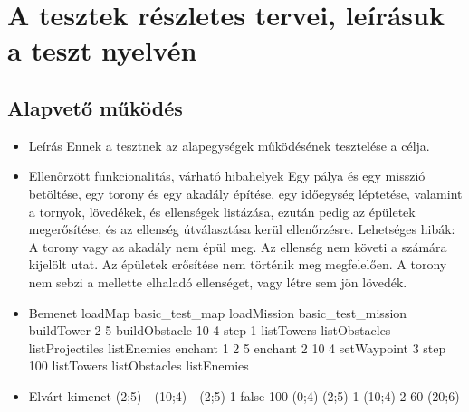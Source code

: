 \section{A tesztek részletes tervei, leírásuk a teszt nyelvén}

\subsection{Alapvető működés}
\begin{itemize}
\item Leírás\newline
Ennek a tesztnek az alapegységek működésének tesztelése a célja.
\item Ellenőrzött funkcionalitás, várható hibahelyek\newline
Egy pálya és egy misszió betöltése, egy torony és egy akadály építése, egy időegység léptetése, valamint a tornyok, lövedékek, és ellenségek listázása, ezután pedig az épületek megerősítése, és az ellenség útválasztása kerül ellenőrzésre. Lehetséges hibák: A torony vagy az akadály nem épül meg. Az ellenség nem követi a számára kijelölt utat. Az épületek erősítése nem történik meg megfelelően. A torony nem sebzi a mellette elhaladó ellenséget, vagy létre sem jön lövedék.
\item Bemenet\newline
loadMap basic\_test\_map\newline
loadMission basic\_test\_mission\newline
buildTower 2 5\newline
buildObstacle 10 4\newline
step 1\newline
listTowers\newline
listObstacles\newline
listProjectiles\newline
listEnemies\newline
enchant 1 2 5\newline
enchant 2 10 4\newline
setWaypoint 3\newline
step 100\newline
listTowers\newline
listObstacles\newline
listEnemies\newline
\item Elvárt kimenet (2;5)	- (10;4)	- (2;5)	1	false 100	(0;4) (2;5)	1 (10;4)	2 60	(20;6)\newline
\end{itemize}


